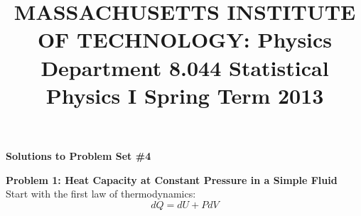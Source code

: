 \documentclass{article}
\title{MASSACHUSETTS INSTITUTE OF TECHNOLOGY: Physics Department 8.044 Statistical Physics I Spring Term 2013}
\date{}
\begin{document}
\maketitle
\noindent
{\LARGE \textbf{Solutions to Problem Set \#4}}
\vspace{5mm}

\noindent
\textbf{Problem 1: Heat Capacity at Constant Pressure in a Simple Fluid}\\
Start with the first law of thermodynamics:
\begin{equation}
dQ = dU + PdV
\end{equation}
\end{document}
